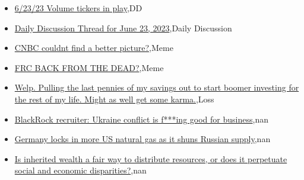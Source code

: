 \documentclass{article}%
\begin{document}
%
\begin{itemize}%
\item%
\href{https://reddit.com/r/wallstreetbets/comments/14gwr43/62323\_volume\_tickers\_in\_play/}{6/23/23 Volume tickers in play},DD%
\item%
\href{https://reddit.com/r/wallstreetbets/comments/14guh7e/daily\_discussion\_thread\_for\_june\_23\_2023/}{Daily Discussion Thread for June 23, 2023},Daily Discussion%
\item%
\href{https://reddit.com/r/wallstreetbets/comments/14gouyi/cnbc\_couldnt\_find\_a\_better\_picture/}{CNBC couldnt find a better picture?},Meme%
\item%
\href{https://reddit.com/r/wallstreetbets/comments/14gnyb9/frc\_back\_from\_the\_dead/}{FRC BACK FROM THE DEAD?},Meme%
\item%
\href{https://reddit.com/r/wallstreetbets/comments/14gnsgf/welp\_pulling\_the\_last\_pennies\_of\_my\_savings\_out/}{Welp. Pulling the last pennies of my savings out to start boomer investing for the rest of my life. Might as well get some karma.},Loss%
\item%
\href{https://reddit.com/r/Economics/comments/14gvazg/blackrock\_recruiter\_ukraine\_conflict\_is\_fing\_good/}{BlackRock recruiter: Ukraine conflict is f***ing good for business},nan%
\item%
\href{https://reddit.com/r/Economics/comments/14ghpe5/germany\_locks\_in\_more\_us\_natural\_gas\_as\_it\_shuns/}{Germany locks in more US natural gas as it shuns Russian supply},nan%
\item%
\href{https://reddit.com/r/Economics/comments/14gfu4h/is\_inherited\_wealth\_a\_fair\_way\_to\_distribute/}{Is inherited wealth a fair way to distribute resources, or does it perpetuate social and economic disparities?},nan%
\end{itemize}%
\end{document}
